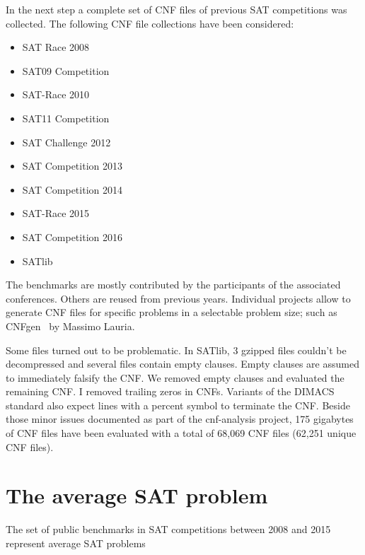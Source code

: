 In the next step a complete set of CNF files of previous SAT competitions was collected.
The following CNF file collections have been considered:

\begin{center}
  \begin{minipage}{0.48\linewidth}
    \begin{itemize}
      \itemsep2pt
      \item SAT Race 2008
      \item SAT09 Competition
      \item SAT-Race 2010
      \item SAT11 Competition
      \item SAT Challenge 2012
    \end{itemize}
  \end{minipage}
  \begin{minipage}{0.48\linewidth}
    \begin{itemize}
      \itemsep2pt
      \item SAT Competition 2013
      \item SAT Competition 2014
      \item SAT-Race 2015
      \item SAT Competition 2016
      \item SATlib~\cite{satlib}
    \end{itemize}
  \end{minipage}
\end{center}

The benchmarks are mostly contributed by the participants of the associated conferences.
Others are reused from previous years. Individual projects allow to generate CNF files
for specific problems in a selectable problem size; such as CNFgen~\cite{cnfgen} by
Massimo Lauria.

Some files turned out to be problematic. In SATlib, 3 gzipped files couldn't be decompressed and several files
contain empty clauses. Empty clauses are assumed to immediately falsify the CNF.
We removed empty clauses and evaluated the remaining CNF.
I removed trailing zeros in CNFs. Variants of the DIMACS standard also expect lines with a percent symbol to
terminate the CNF. Beside those minor issues documented as part of the cnf-analysis project,
175 gigabytes of CNF files have been evaluated with a total of 68,069 CNF files (62,251 unique CNF files).

\section{The average SAT problem}
\label{sec:features-average}
%
\begin{prop}
  The set of public benchmarks in SAT competitions between 2008 and 2015
  represent average SAT problems
\end{prop}

